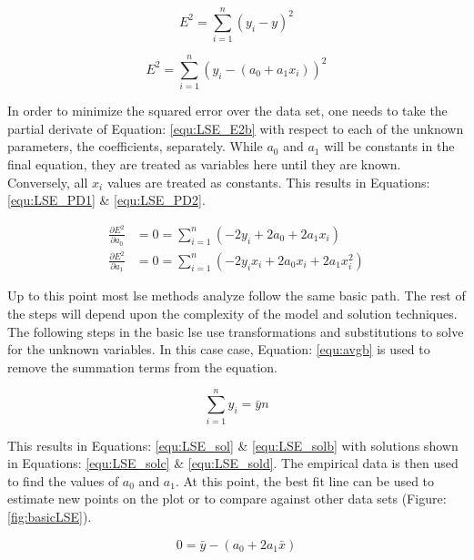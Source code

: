 \begin{equation}
\label{equ:LSE_E2}
E^2 = \sum_{i=1}^{n} (y_i - y)^2
\end{equation}

\begin{equation}
\label{equ:LSE_E2b}
E^2 = \sum_{i=1}^{n} (y_i - (a_0 + a_1 x_i))^2
\end{equation}

In order to minimize the squared error over the data set, one needs to take the partial derivate of Equation: \eqref{equ:LSE_E2b} with respect to each of the unknown parameters, the coefficients, separately. While $a_0$ and $a_1$ will be constants in the final equation, they are treated as variables here until they are known. Conversely, all $x_i$ values are treated as constants. This results in Equations: \eqref{equ:LSE_PD1} \& \eqref{equ:LSE_PD2}.

\begin{align} 
    \frac{\partial E^2}{\partial a_0} &= 0 = \sum_{i=1}^{n} (-2y_i +2a_0 + 2a_1 x_i)           \label{equ:LSE_PD1} \\
    \frac{\partial E^2}{\partial a_1} &= 0 = \sum_{i=1}^{n} (-2y_i x_i +2a_0 x_i + 2a_1 x_i^2) \label{equ:LSE_PD2}
\end{align}

Up to this point most \gls{lse} methods analyze follow the same basic path. The rest of the steps will depend upon the complexity of the model and solution techniques. The following steps in the basic \gls{lse} use transformations and substitutions to solve for the unknown variables. In this case case, Equation: \eqref{equ:avgb} is used to remove the summation terms from the equation.

\begin{equation}
    \label{equ:avgb} 
    \sum_{i=1}^{n} y_i  = \bar{y}n
\end{equation}

This results in Equations: \eqref{equ:LSE_sol} \& \eqref{equ:LSE_solb} with solutions shown in Equations: \eqref{equ:LSE_solc} \& \eqref{equ:LSE_sold}. The empirical data is then used to find the values of $a_0$ and $a_1$. At this point, the best fit line can be used to estimate new points on the plot or to compare against other data sets (Figure: \ref{fig:basicLSE}).



\begin{equation}
    \label{equ:LSE_sol}
    0 = \bar{y} - (a_0 + 2a_1 \bar{x})
\end{equation}

